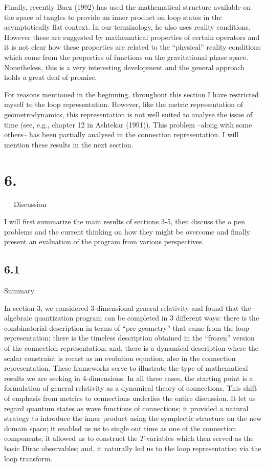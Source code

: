 Finally, recently Baez (1992) has used the mathematical structure available
on the space of tangles to provide an inner product on loop states in the
asymptotically flat context. In our terminology, he also uses reality
conditions.  However these are suggested by mathematical properties of certain
operators and it is not clear how these properties are related to the
``physical'' reality conditions which come from the properties of functions
on the gravitational phase space. Nonetheless, this is a very interesting
development and the general approach holds a great deal of promise.

For reasons mentioned in the beginning, throughout this section I have
restricted myself to the loop representation. However, like the metric
representation of geometrodynamics, this representation is not well suited to
analyse the issue of time (see, e.g., chapter 12 in Ashtekar (1991)). This
problem --along with some others-- has been partially analysed in the
connection representation. I will mention these results in the next section.

\vfill\break

%
\section{6.}{${}\quad$ Discussion}%

I will first summarize the main results of sections 3-5, then discuss the o
pen problems and the current thinking on how they might be
overcome and finally present an evaluation of the program from various
perspectives.

\goodbreak
\subsection{6.1}{Summary}%

In section 3, we considered 3-dimensional general relativity and found
that the algebraic quantization program can be completed in 3 different
ways: there is the combinatorial description in terms of ``pre-geometry''
that came from the loop representation; there is the timeless description
obtained in the ``frozen'' version of the connection representation; and,
there is a dynamical description where the scalar constraint is recast as
an evolution equation, also in the connection representation. These frameworks
serve to illustrate the type of mathematical results we are seeking in
4-dimensions. In all three cases, the starting point is a formulation of
general relativity as a dynamical theory of connections. This shift of
emphasis from metrics to connections underlies the entire discussion. It let
us regard quantum states as wave functions of connections; it provided
a natural strategy to introduce the inner product using the symplectic
structure on the new domain space; it enabled us
us to single out time as one of the connection components; it allowed us to
construct the $T$-variables which then served as the basic Dirac
observables; and, it naturally led us to the loop representation via the loop
transform.

